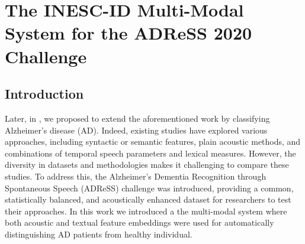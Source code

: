 
\section{The INESC-ID Multi-Modal System for the ADReSS 2020 Challenge}
\subsection{Introduction}
Later, in \cite{pompili2020inesc}, we proposed to extend the aforementioned work by classifying Alzheimer's disease (AD). Indeed, existing studies have explored various approaches, including syntactic or semantic features, plain acoustic methods, and combinations of temporal speech parameters and lexical measures. However, the diversity in datasets and methodologies makes it challenging to compare these studies. To address this, the Alzheimer's Dementia Recognition through Spontaneous Speech (ADReSS) challenge was introduced, providing a common, statistically balanced, and acoustically enhanced dataset for researchers to test their approaches. In this work we introduced a  the multi-modal system where both acoustic and textual feature embeddings were used for automatically distinguishing AD patients
from healthy individual. 

